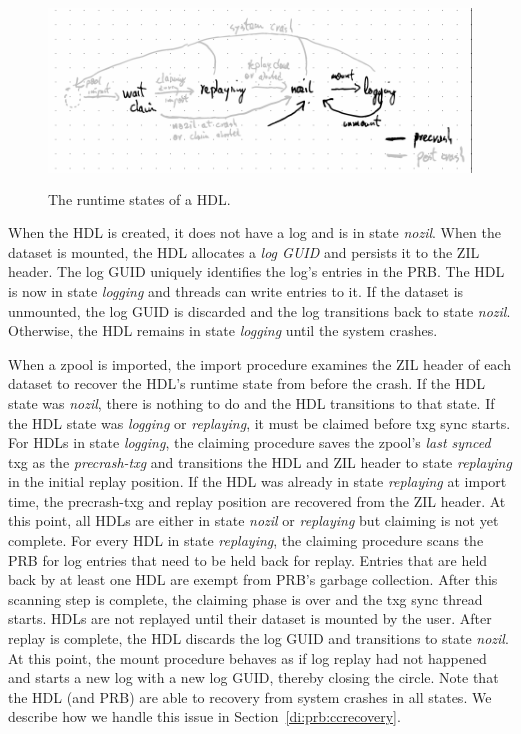 \documentclass[12pt,a4paper,twoside]{book}
\begin{document}
\begin{figure}[H]
    \centering
    \includegraphics[height=5cm]{fig/prb_hdl_runtime_states}
    \caption{The runtime states of a HDL.}
\end{figure}

When the HDL is created, it does not have a log and is in state \textit{nozil}.
When the dataset is mounted, the HDL allocates a \textit{log GUID} and persists it to the ZIL header.
The log GUID uniquely identifies the log's entries in the PRB.
The HDL is now in state \textit{logging} and threads can write entries to it.
If the dataset is unmounted, the log GUID is discarded and the log transitions back to state \textit{nozil}.
Otherwise, the HDL remains in state \textit{logging} until the system crashes.

When a zpool is imported, the import procedure examines the ZIL header of each dataset to recover the HDL's runtime state from before the crash.
If the HDL state was \textit{nozil}, there is nothing to do and the HDL transitions to that state.
If the HDL state was \textit{logging} or \textit{replaying}, it must be claimed before txg sync starts.
For HDLs in state \textit{logging}, the claiming procedure saves the zpool's \textit{last synced} txg as the \textit{precrash-txg} and transitions the HDL and ZIL header to state \textit{replaying} in the initial replay position.
If the HDL was already in state \textit{replaying} at import time, the precrash-txg and replay position are recovered from the ZIL header.
At this point, all HDLs are either in state \textit{nozil} or \textit{replaying} but claiming is not yet complete.
For every HDL in state \textit{replaying}, the claiming procedure scans the PRB for log entries that need to be held back for replay.
Entries that are held back by at least one HDL are exempt from PRB's garbage collection.
After this scanning step is complete, the claiming phase is over and the txg sync thread starts.
HDLs are not replayed until their dataset is mounted by the user. %
After replay is complete, the HDL discards the log GUID and transitions to state \textit{nozil}.
At this point, the mount procedure behaves as if log replay had not happened and starts a new log with a new log GUID, thereby closing the circle.
Note that the HDL (and PRB) are able to recovery from system crashes in all states.
We describe how we handle this issue in Section~\ref{di:prb:ccrecovery}.
\end{document}
